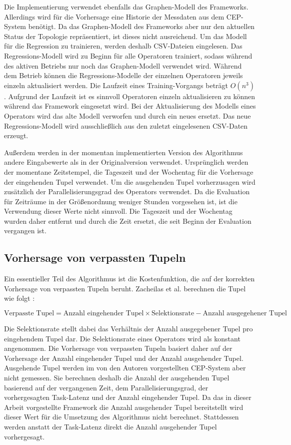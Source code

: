 Die Implementierung verwendet ebenfalls das Graphen-Modell des Frameworks.
Allerdings wird für die Vorhersage eine Historie der Messdaten aus dem CEP-System benötigt.
Da das Graphen-Modell des Frameworks aber nur den aktuellen Status der Topologie repräsentiert, ist dieses nicht ausreichend.
Um das Modell für die Regression zu trainieren, werden deshalb CSV-Dateien eingelesen.
Das Regressions-Modell wird zu Beginn für alle Operatoren trainiert, sodass während des aktiven Betriebs nur noch das Graphen-Modell verwendet wird.
Während dem Betrieb können die Regressions-Modelle der einzelnen Operatoren jeweils einzeln aktualisiert werden.
Die Laufzeit eines Training-Vorgangs beträgt \(O(n^3)\) \cite{zacheilas_elastic_2015}.
Aufgrund der Laufzeit ist es sinnvoll Operatoren einzeln aktualisieren zu können während das Framework eingesetzt wird.
Bei der Aktualisierung des Modells eines Operators wird das alte Modell verworfen und durch ein neues ersetzt.
Das neue Regressions-Modell wird ausschließlich aus den zuletzt eingelesenen CSV-Daten erzeugt.

Außerdem werden in der momentan implementierten Version des Algorithmus andere Eingabewerte als in der Originalversion verwendet.
Ursprünglich werden der momentane Zeitstempel, die Tageszeit und der Wochentag für die Vorhersage der eingehenden Tupel verwendet.
Um die ausgehenden Tupel vorherzusagen wird zusätzlich der Parallelisierungsgrad des Operators verwendet.
Da die Evaluation für Zeiträume in der Größenordnung weniger Stunden vorgesehen ist, ist die Verwendung dieser Werte nicht sinnvoll.
Die Tageszeit und der Wochentag wurden daher entfernt und durch die Zeit ersetzt, die seit Beginn der Evaluation vergangen ist.

\subsection{Vorhersage von verpassten Tupeln}

Ein essentieller Teil des Algorithmus ist die Kostenfunktion, die auf der korrekten Vorhersage von verpassten Tupeln beruht.
Zacheilas et al. berechnen die Tupel wie folgt \cite{zacheilas_elastic_2015}:

\[\text{Verpasste Tupel} = \text{Anzahl eingehender Tupel} \times \text{Selektionsrate} - \text{Anzahl ausgegehener Tupel}\]

Die Selektionsrate stellt dabei das Verhältnis der Anzahl ausgegebener Tupel pro eingehendem Tupel dar.
Die Selektionsrate eines Operators wird als konstant angenommen.
Die Vorhersage von verpassten Tupeln basiert daher auf der Vorhersage der Anzahl eingehender Tupel und der Anzahl ausgehender Tupel.
Ausgehende Tupel werden im von den Autoren vorgestellten CEP-System aber nicht gemessen.
Sie berechnen deshalb die Anzahl der ausgehenden Tupel basierend auf der vergangenen Zeit, dem Parallelisierungsgrad, der vorhergesagten Task-Latenz und der Anzahl eingehender Tupel.
Da das in dieser Arbeit vorgestellte Framework die Anzahl ausgehender Tupel bereitstellt wird dieser Wert für die Umsetzung des Algorithmus nicht berechnet.
Stattdessen werden anstatt der Task-Latenz direkt die Anzahl ausgehender Tupel vorhergesagt.

